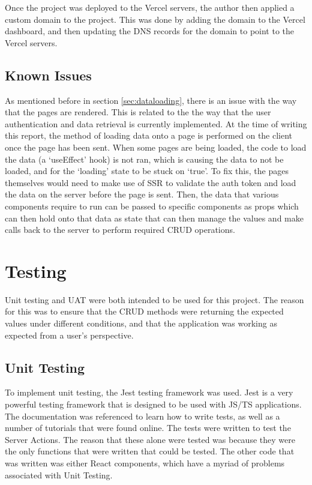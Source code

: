 \documentclass[11pt, a4paper,twoside]{report}
\theoremstyle{plain} %
\theoremstyle{definition} %
\numberwithin{equation}{chapter}
\begin{document}
Once the project was deployed to the Vercel servers, the author then applied
a custom domain to the project. This was done by adding the domain to the
Vercel dashboard, and then updating the DNS records for the domain to point to
the Vercel servers.

\section{Known Issues}\label{sec:knownissues}

As mentioned before in section \ref{sec:dataloading}, there is an issue with
the way that the pages are rendered. This is related to the the way that the
user authentication and data retrieval is currently implemented. At the time of
writing this report, the method of loading data onto a page is performed on the
client once the page has been sent. When some pages are being loaded, the code
to load the data (a `useEffect' hook) is not ran, which is causing the data to
not be loaded, and for the `loading' state to be stuck on `true'. To fix this,
the pages themselves would need to make use of SSR to validate the auth token
and load the data on the server before the page is sent. Then, the data that
various components require to run can be passed to specific components as props
which can then hold onto that data as state that can then manage the values and
make calls back to the server to perform required CRUD operations.

\chapter{Testing}\label{ch:testing}

Unit testing and UAT were both intended to be used for this project. The reason
for this was to ensure that the CRUD methods were returning the expected values
under different conditions, and that the application was working as expected
from a user's perspective.

\section{Unit Testing}\label{sec:unittesting}

To implement unit testing, the Jest testing framework was used. Jest is a very
powerful testing framework that is designed to be used with JS/TS applications.
The documentation was referenced to learn how to write
tests\cite{learn-jest-1}, as well as a number of tutorials that were found
online\cite{learn-jest-2}\cite{learn-jest-3}. The tests were written to test
the Server Actions. The reason that these alone were tested was because they
were the only functions that were written that could be tested. The other code
that was written was either React components, which have a myriad of problems
associated with Unit Testing.
\end{document}
